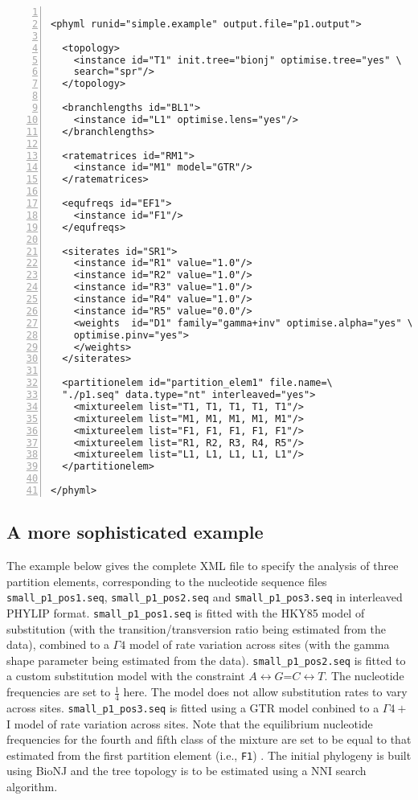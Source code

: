 \documentclass[a4paper,12pt]{article}
\newcommand{\x}[1]{\texttt{#1}}
\begin{document}
\vspace{0.2cm}
\begin{Verbatim}[frame=single, label=Simple PhyML XML example, samepage=true, baselinestretch=0.5,
  fontsize=\small, numbers=left]

<phyml runid="simple.example" output.file="p1.output">

  <topology>
    <instance id="T1" init.tree="bionj" optimise.tree="yes" \
    search="spr"/>
  </topology>
  
  <branchlengths id="BL1">
    <instance id="L1" optimise.lens="yes"/>
  </branchlengths>

  <ratematrices id="RM1">
    <instance id="M1" model="GTR"/>
  </ratematrices>
  
  <equfreqs id="EF1">
    <instance id="F1"/>
  </equfreqs>

  <siterates id="SR1">
    <instance id="R1" value="1.0"/>
    <instance id="R2" value="1.0"/>
    <instance id="R3" value="1.0"/>
    <instance id="R4" value="1.0"/>
    <instance id="R5" value="0.0"/>
    <weights  id="D1" family="gamma+inv" optimise.alpha="yes" \
    optimise.pinv="yes">
    </weights>
  </siterates>

  <partitionelem id="partition_elem1" file.name=\
  "./p1.seq" data.type="nt" interleaved="yes">
    <mixtureelem list="T1, T1, T1, T1, T1"/>
    <mixtureelem list="M1, M1, M1, M1, M1"/>
    <mixtureelem list="F1, F1, F1, F1, F1"/>
    <mixtureelem list="R1, R2, R3, R4, R5"/>
    <mixtureelem list="L1, L1, L1, L1, L1"/>
  </partitionelem>
  
</phyml>

\end{Verbatim}


\subsection{A more sophisticated example}

The example below gives  the complete XML file to specify the analysis  of three partition elements,
corresponding to the nucleotide  sequence files \x{small\_p1\_pos1.seq}, \x{small\_p1\_pos2.seq} and
\x{small\_p1\_pos3.seq} in  interleaved PHYLIP  format. \x{small\_p1\_pos1.seq}  is fitted  with the
HKY85 model of substitution (with the  transition/transversion ratio being estimated from the data),
combined to a $\Gamma4$  model of rate variation across sites (with the  gamma shape parameter being
estimated from the data).  \x{small\_p1\_pos2.seq} is fitted to a custom substitution model with the
constraint  $A\leftrightarrow  G$=$C\leftrightarrow  T$.  The  nucleotide  frequencies  are  set  to
$\frac{1}{4}$   here.    The   model   does   not  allow   substitution   rates   to   vary   across
sites. \x{small\_p1\_pos3.seq} is fitted  using a GTR model conbined to a  $\Gamma4+$I model of rate
variation across sites.  Note that the equilibrium  nucleotide frequencies for the  fourth and fifth
class of the mixture are  set to be equal to that estimated from  the first partition element (i.e.,
\x{F1}) . The initial phylogeny is built using BioNJ  and the tree topology is to be estimated using
a NNI search algorithm.
\end{document}
